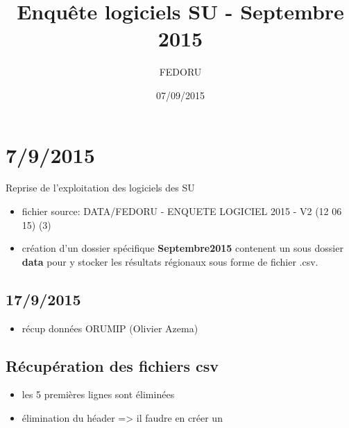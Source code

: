 \documentclass[]{article}
\title{Enquête logiciels SU - Septembre 2015}
\author{FEDORU}
\date{07/09/2015}
\begin{document}
\maketitle


{
\hypersetup{linkcolor=black}
\setcounter{tocdepth}{2}
\tableofcontents
}
\section{7/9/2015}\label{section}

Reprise de l'exploitation des logiciels des SU

\begin{itemize}
\itemsep1pt\parskip0pt
\item
  fichier source: DATA/FEDORU - ENQUETE LOGICIEL 2015 - V2 (12 06 15)
  (3)
\item
  création d'un dossier spécifique \textbf{Septembre2015} contenent un
  sous dossier \textbf{data} pour y stocker les résultats régionaux sous
  forme de fichier .csv.
\end{itemize}

\subsection{17/9/2015}\label{section-1}

\begin{itemize}
\itemsep1pt\parskip0pt
\item
  récup données ORUMIP (Olivier Azema)
\end{itemize}

\subsection{Récupération des fichiers
csv}\label{recuperation-des-fichiers-csv}

\begin{itemize}
\itemsep1pt\parskip0pt
\item
  les 5 premières lignes sont éliminées
\item
  élimination du héader =\textgreater{} il faudre en créer un
\end{itemize}
\end{document}
